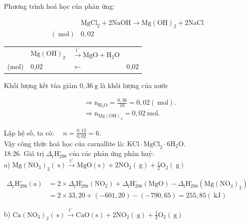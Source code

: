 \documentclass[10pt]{article}
\begin{document}
Phương trình hoá học của phản ứng:

$$
\begin{array}{ll} 
& \mathrm{MgCl}_{2}+2 \mathrm{NaOH} \rightarrow \mathrm{Mg}(\mathrm{OH})_{2}+2 \mathrm{NaCl} \\
(\mathrm{~mol}) & 0,02
\end{array}
$$

\begin{center}
\begin{tabular}{lllr}
 & $\mathrm{Mg}(\mathrm{OH})_{2}$ & $\xrightarrow{\mathrm{t}^{\circ}} \mathrm{MgO}+\mathrm{H}_{2} \mathrm{O}$ &  \\
(mol) & 0,02 & $\leftarrow$ & 0,02 \\
\end{tabular}
\end{center}

Khối lượng kết tủa giảm $0,36 \mathrm{~g}$ là khối lượng của nước

$$
\begin{aligned}
& \Rightarrow \mathrm{n}_{\mathrm{H}_{2} \mathrm{O}}=\frac{0,36}{18}=0,02(\mathrm{~mol}) . \\
& \Rightarrow \mathrm{n}_{\mathrm{Mg}(\mathrm{OH})_{2}}=0,02 \mathrm{~mol} .
\end{aligned}
$$

Lập hệ số, ta có: $\quad n=\frac{0,12}{0,02}=6$.\\
Vậy công thức hoá học của carnallite là: $\mathrm{KCl} \cdot \mathrm{MgCl}_{2} \cdot 6 \mathrm{H}_{2} \mathrm{O}$.\\
18.26. Giá trị $\Delta_{\mathrm{r}} \mathrm{H}_{298}^{\circ}$ của các phản ứng phân huỷ:\\
a) $\mathrm{Mg}\left(\mathrm{NO}_{3}\right)_{2}(\mathrm{~s}) \xrightarrow{\mathrm{t}^{\circ}} \mathrm{MgO}(\mathrm{s})+2 \mathrm{NO}_{2}(\mathrm{~g})+\frac{1}{2} \mathrm{O}_{2}(\mathrm{~g})$

$$
\begin{aligned}
\Delta_{\mathrm{r}} \mathrm{H}_{298}^{\circ}(\mathrm{a}) & =2 \times \Delta_{\mathrm{f}} \mathrm{H}_{298}^{\circ}\left(\mathrm{NO}_{2}\right)+\Delta_{\mathrm{f}} \mathrm{H}_{298}^{\circ}(\mathrm{MgO})-\Delta_{\mathrm{f}} \mathrm{H}_{298}^{\circ}\left(\mathrm{Mg}\left(\mathrm{NO}_{3}\right)_{2}\right) \\
& =2 \times 33,20+(-601,20)-(-790,65)=255,85(\mathrm{~kJ})
\end{aligned}
$$

b) $\mathrm{Ca}\left(\mathrm{NO}_{3}\right)_{2}(\mathrm{~s}) \xrightarrow{\mathrm{t}^{\circ}} \mathrm{CaO}(\mathrm{s})+2 \mathrm{NO}_{2}(\mathrm{~g})+\frac{1}{2} \mathrm{O}_{2}(\mathrm{~g})$
\end{document}

